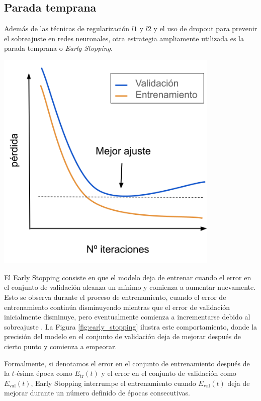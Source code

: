 \subsection{Parada temprana}

Además de las técnicas de regularización $l1$ y $l2$ y el uso de dropout para prevenir el sobreajuste en redes neuronales, otra estrategia ampliamente utilizada es la parada temprana o \textit{Early Stopping}.

\begin{minipage}{0.35\textwidth}
\centering
    \includegraphics[width=0.8\textwidth]{img/earlyStopping.png}
    \label{fig:early_stopping}
\end{minipage}
\begin{minipage}{0.6\textwidth}
     El Early Stopping consiste en que el modelo deja de entrenar cuando el error en el conjunto de validación alcanza un mínimo y comienza a aumentar nuevamente. Esto se observa durante el proceso de entrenamiento, cuando el error de entrenamiento continúa disminuyendo mientras que el error de validación inicialmente disminuye, pero eventualmente comienza a incrementarse debido al sobreajuste \citep{geron2022hands}. La Figura \ref{fig:early_stopping} ilustra este comportamiento, donde la precisión del modelo en el conjunto de validación deja de mejorar después de cierto punto y comienza a empeorar.
     
\bigskip

Formalmente, si denotamos el error en el conjunto de entrenamiento después de la \( t \)-ésima época como \( E_{\text{tr}}(t) \) y el error en el conjunto de validación como \( E_{\text{val}}(t) \), Early Stopping interrumpe el entrenamiento cuando \( E_{\text{val}}(t) \) deja de mejorar durante un número definido de épocas consecutivas. 
\end{minipage}


